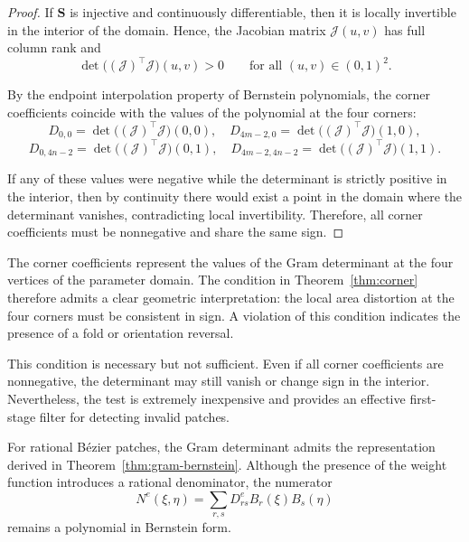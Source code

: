 \documentclass{jssc}
\begin{document}
\begin{proof}
If $\mathbf{S}$ is injective and continuously differentiable, then it is locally invertible in the interior of the domain. 
Hence, the Jacobian matrix $\bm{\mathcal{J}}(u,v)$ has full column rank and
\begin{equation}
    \det\!\big((\bm{\mathcal{J}})^\top \bm{\mathcal{J}}\big)(u,v) > 0
    \qquad \text{for all } (u,v)\in(0,1)^2.
\end{equation}

By the endpoint interpolation property of Bernstein polynomials, the corner coefficients coincide with the values of the polynomial at the four corners:
\begin{equation}
    D_{0,0} = \det\!\big((\bm{\mathcal{J}})^\top \bm{\mathcal{J}}\big)(0,0), \quad
    D_{4m-2,0} = \det\!\big((\bm{\mathcal{J}})^\top \bm{\mathcal{J}}\big)(1,0),
\end{equation}
\begin{equation}
    D_{0,4n-2} = \det\!\big((\bm{\mathcal{J}})^\top \bm{\mathcal{J}}\big)(0,1), \quad
    D_{4m-2,4n-2} = \det\!\big((\bm{\mathcal{J}})^\top \bm{\mathcal{J}}\big)(1,1).
\end{equation}

If any of these values were negative while the determinant is strictly positive in the interior, 
then by continuity there would exist a point in the domain where the determinant vanishes, 
contradicting local invertibility. 
Therefore, all corner coefficients must be nonnegative and share the same sign.
\end{proof}

\begin{remark}
The corner coefficients represent the values of the Gram determinant at the four vertices of the parameter domain. The condition in Theorem~\ref{thm:corner} therefore admits a clear geometric interpretation: the local area distortion at the four corners must be consistent in sign. A violation of this condition indicates the presence of a fold or orientation reversal.

This condition is necessary but not sufficient. Even if all corner coefficients are nonnegative, the determinant may still vanish or change sign in the interior. Nevertheless, the test is extremely inexpensive and provides an effective first-stage filter for detecting invalid patches.
\end{remark}

For rational B\'ezier patches, the Gram determinant admits the representation derived in Theorem~\ref{thm:gram-bernstein}. Although the presence of the weight function introduces a rational denominator, the numerator
\begin{equation}
N^e(\xi,\eta)
=
\sum_{r,s} D_{rs}^e B_r(\xi) B_s(\eta)
\end{equation}
remains a polynomial in Bernstein form.
\end{document}
